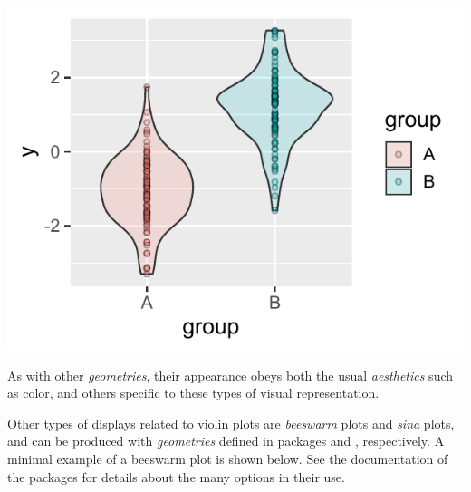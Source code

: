 \documentclass[krantz2]{krantz}\usepackage{knitr}
\begin{document}
\begin{knitrout}\footnotesize
{}\color{fgcolor}\begin{kframe}
\begin{alltt}
    \hlopt{+}
  \hlstd{(} \hlstd{=} \hlstd{)} \hlopt{+}
  \hlstd{(} \hlstd{=} \hlstd{,}  \hlstd{=} \hlstd{,}
              \hlstd{=} \hlstd{,}  \hlstd{=} \hlstd{)}
\end{alltt}
\end{kframe}

{\centering \includegraphics[width=.54\textwidth]{figure/pos-violin-plot-02-1} 

}



\end{knitrout}

As with other \emph{geometries}, their appearance obeys both the usual \emph{aesthetics} such as color, and others specific to these types of visual representation.

Other types of displays related to violin plots are \emph{beeswarm} plots and \emph{sina} plots, and can be produced with \emph{geometries} defined in packages  and , respectively. A minimal example of a beeswarm plot is shown below. See the documentation of the packages for details about the many options in their use.
\end{document}
